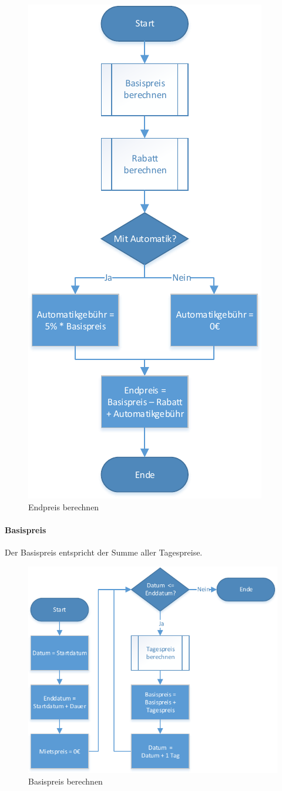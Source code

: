 \begin{figure}[H]
	\centering
	\includegraphics[width=0.4\linewidth]{Bilder/Endpreis_berechnen}
	\caption{Endpreis berechnen}
	\label{fig:Endpreis_berechnen}
\end{figure}

\newpage 
\paragraph{Basispreis}

Der Basispreis entspricht der Summe aller Tagespreise.

\begin{figure}[H]
	\centering
	\includegraphics[width=1.0\linewidth]{Bilder/Basispreis_berechnen}
	\caption{Basispreis berechnen}
	\label{fig:Basispreis_berechnen}
\end{figure}

